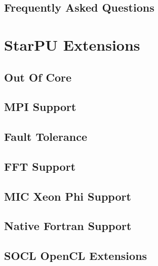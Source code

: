 \chapter{Frequently Asked Questions}
\label{FrequentlyAskedQuestions}
\hypertarget{FrequentlyAskedQuestions}{}


\part{StarPU Extensions}

\chapter{Out Of Core}
\label{OutOfCore}
\hypertarget{OutOfCore}{}


\chapter{MPI Support}
\label{MPISupport}
\hypertarget{MPISupport}{}


\chapter{Fault Tolerance}
\label{FaultTolerance}
\hypertarget{FaultTolerance}{}


\chapter{FFT Support}
\label{FFTSupport}
\hypertarget{FFTSupport}{}


\chapter{MIC Xeon Phi Support}
\label{MICSupport}
\hypertarget{MICSupport}{}


\chapter{Native Fortran Support}
\label{NativeFortranSupport}
\hypertarget{NativeFortranSupport}{}


\chapter{SOCL OpenCL Extensions}
\label{SOCLOpenclExtensions}
\hypertarget{SOCLOpenclExtensions}{}


